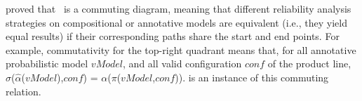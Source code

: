 \citet{Castro2017} proved that~ is a commuting diagram, meaning that different reliability analysis strategies on compositional or annotative models are equivalent (i.e., they yield equal results) if their corresponding paths share the start and end points. For example, commutativity for the top-right quadrant means that, for all annotative probabilistic model $\mathit{vModel}$, and all valid configuration $\mathit{conf}$ of the product line, $\sigma$($\hat\alpha$($\mathit{vModel}$),$\mathit{conf}$) = $\alpha$($\pi$($\mathit{vModel}$,$\mathit{conf}$)).  is an instance of this commuting relation.





